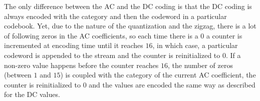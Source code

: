 \vspace{1em}

The only difference between the AC and the DC coding is that the DC coding is always encoded with the category and then the codeword in a particular codebook. Yet, due to the nature of the quantization and the zigzag, there is a lot of following zeros in the AC coefficients, so each time there is a $0$ a counter is incremented at encoding time until it reaches $16$, in which case, a particular codeword is appended to the stream and the counter is reinitialized to $0$. 
If a non-zero value happens before the counter reaches $16$, the number of zeros (between $1$ and $15$) is coupled with the category of the current AC coefficient, the counter is reinitialized to $0$ and the values are encoded the same way as described for the DC values.

%
